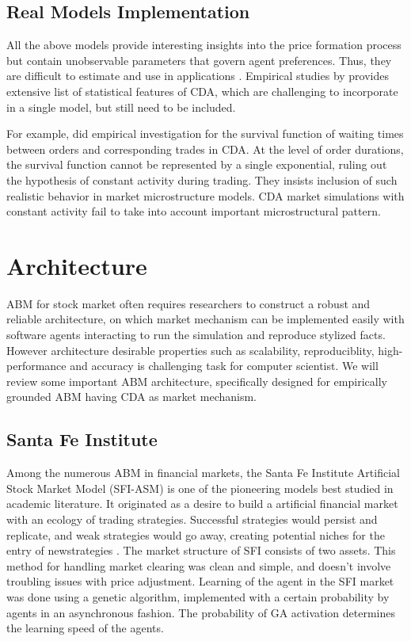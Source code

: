 \documentclass[12pt,a4paper]{article}
\numberwithin{equation}{section}
\numberwithin{figure}{section}
\numberwithin{table}{section}
\begin{document}
\subsection{Real Models Implementation}
All the above models provide interesting insights into the price formation process but contain unobservable
parameters that govern agent preferences. Thus, they are difficult to estimate and use in applications \citep{cont2010}. Empirical studies by \citet{TothEislerLilloKockelkorenBouchaudFarmer2012, FarmerZamani2007, Bouchaud2002, Farmer2004} provides  extensive list of statistical  features of CDA, which are challenging to incorporate in a single model, but still need to be included.
 
For example, \citet{scalas2006} did empirical investigation for the survival function of waiting times between orders and corresponding trades in CDA. At the level of order durations, the survival function cannot be represented by a single exponential, ruling out the hypothesis of constant activity during trading. They insists inclusion of such realistic behavior in market microstructure models. CDA market simulations with constant activity \citep{SmithFarmerGillemotKrishnamurty2003, farmer2005} fail to take into account important microstructural pattern.

\section{Architecture}\label{sec:arch}
ABM for stock market often requires researchers to construct a robust and reliable architecture, on which market mechanism can be implemented easily with software agents interacting to run the simulation and reproduce 
stylized facts. However architecture desirable properties such as scalability, reproduciblity, high-performance and accuracy is challenging task for computer scientist. We will review some important ABM architecture, specifically designed for empirically grounded ABM having CDA as market mechanism.

\subsection{Santa Fe Institute}

Among the numerous ABM in financial markets, the Santa Fe Institute Artificial Stock Market Model (SFI-ASM) is one of the pioneering models best studied in academic literature. It originated as a desire to build a artificial financial market with an ecology of trading strategies. Successful strategies would persist and replicate, and weak strategies would go away, creating potential niches for the entry of newstrategies \citep{LeBaron2002}. The market structure of SFI consists of two assets. This method for handling market clearing was clean and simple, and doesn’t involve troubling issues with price adjustment. Learning of the agent in the SFI market was done using a genetic
algorithm, implemented with a certain probability by agents in an asynchronous fashion. The probability of GA activation determines the learning speed of the agents.
\end{document}
